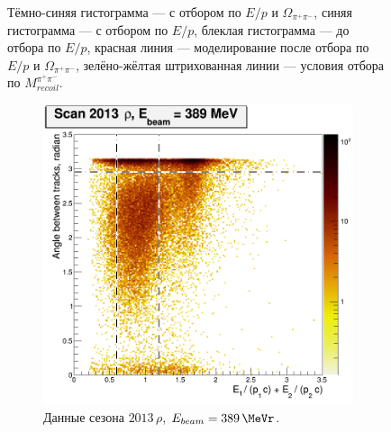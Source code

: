\begin{figure}
\begin{minipage}[t]{0.45\textwidth}
        \caption{Тёмно-синяя гистограмма --- с отбором по $E/p$ и $\Omega_{\pi^+ \pi^-}$,
            синяя гистограмма --- с отбором по $E/p$,
            блеклая гистограмма --- до отбора по $E/p$,
            красная линия --- моделирование после отбора по $E/p$ и $\Omega_{\pi^+ \pi^-}$,
            зелёно-жёлтая штрихованная линии --- условия отбора по $M_{recoil}^{\pi^+ \pi^-}$.}
        \label{fig:mpipi}
  \end{minipage}
\end{figure}


\begin{figure}[htbp]
    \centering
    \begin{subfigure}[b]{0.45\textwidth}
        \includegraphics[width=\textwidth]{img/raskl_vs_sumEP_rho389.png}
        \caption{Данные сезона $2013 \, \rho$, $E_{beam} = \SI{389}{\MeVr}$.}
        \label{fig:raskl_rho389}
    \end{subfigure}
    ~
    \begin{subfigure}[b]{0.45\textwidth}

\end{subfigure}
\end{figure}
